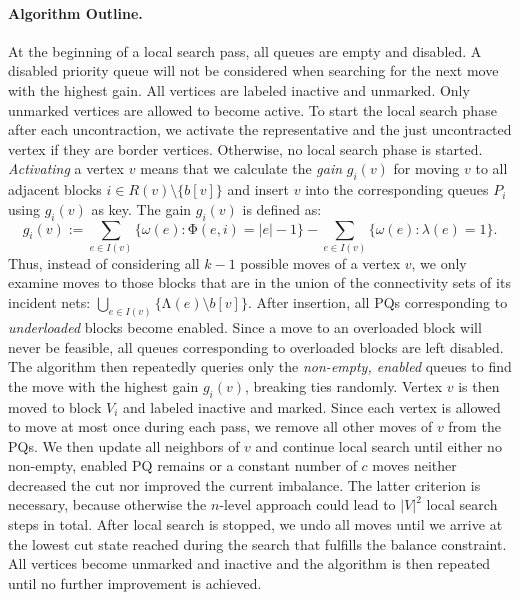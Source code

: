 \documentclass[runningheads,a4paper]{llncs}
\begin{document}
\paragraph{Algorithm Outline.} 
At the beginning of a local search pass, all
queues are empty and disabled. A disabled priority queue will not be considered when searching for the next move with the highest gain. All vertices are labeled inactive and unmarked. Only unmarked vertices are allowed to 
become active. To start the local search phase after each uncontraction, we activate the representative and the just uncontracted vertex if they are border vertices. Otherwise, no local search phase is started. 
\emph{Activating} a vertex $v$ means that we calculate the \emph{gain} $g_{i}(v)$ for moving $v$ to all adjacent blocks $i \in R(v) \setminus \{b[v]\}$ and 
insert  $v$ into the corresponding queues $P_i$ using $g_i(v)$ as key. The gain $g_i(v)$ is defined as: 
\begin{equation} \label{eq:gain}
g_{i}(v) := \sum \limits_{e \in I(v)} \{ \omega(e) : \mathrm{\Phi}(e, i) = |e| - 1\} - \sum \limits_{e \in I(v)} \{ \omega(e) : \lambda(e) = 1\}.
\end{equation}
Thus, instead of considering all $k - 1$ possible moves of a vertex $v$, we only examine moves to those blocks that are in the union of the connectivity sets of its incident nets: $\bigcup_{e \in I(v)} \{\mathrm{\Lambda}(e) \setminus b[v]\} $. After insertion, all PQs corresponding to \emph{underloaded} blocks become enabled. Since a move to an overloaded block will
never be feasible, all queues corresponding to overloaded blocks are left disabled. The algorithm then 
repeatedly queries only the \emph{non-empty, enabled} queues to find the move with the highest gain $g_{i}(v)$, breaking ties randomly. 
Vertex $v$ is then moved to block $V_i$ and labeled inactive and marked. Since each vertex is allowed to move at most once during each pass, we remove all other moves of $v$ from the PQs.
We then update all neighbors of $v$ and continue local search until either no non-empty, enabled PQ remains or a constant number of $c$ moves neither decreased the cut nor improved the current imbalance. The latter criterion is necessary, because otherwise the $n$-level 
approach could lead to $|V|^2$ local search steps in total. 
After local search is stopped, we undo all moves until we arrive at the lowest cut state reached during the search that fulfills the balance constraint. 
All vertices become unmarked and inactive and the algorithm is then repeated until no further improvement is achieved.
\end{document}

